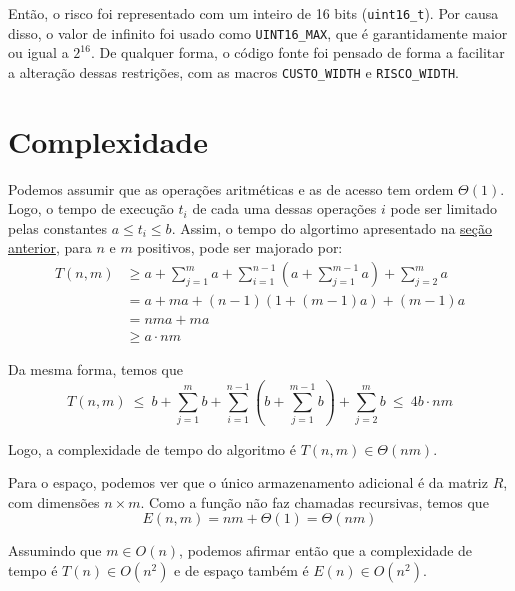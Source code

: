Então, o risco foi representado com um inteiro de 16 bits (\texttt{uint16\_t}). Por causa disso, o valor de infinito foi usado como \texttt{UINT16_MAX}, que é garantidamente maior ou igual a $2^{16}$. De qualquer forma, o código fonte foi pensado de forma a facilitar a alteração dessas restrições, com as macros \texttt{CUSTO\_WIDTH} e \texttt{RISCO\_WIDTH}.

\section{Complexidade}

Podemos assumir que as operações aritméticas e as de acesso tem ordem $\Theta(1)$. Logo, o tempo de execução $t_i$ de cada uma dessas operações $i$ pode ser limitado pelas constantes $a \leq t_i \leq b$. Assim, o tempo do algortimo apresentado na \hyperref[sec:alg]{seção anterior}, para $n$ e $m$ positivos, pode ser majorado por:
\begin{align*}
    T(n, m) &\geq a + \sum_{j = 1}^m a + \sum_{i = 1}^{n - 1} \left( a + \sum_{j = 1}^{m - 1} a \right) + \sum_{j = 2}^m a \\
    &= a + m a + (n - 1) (1 + (m - 1) a) + (m - 1) a \\
    &= n m a + m a \\
    &\geq a \cdot n m
\end{align*}

Da mesma forma, temos que
\[
    T(n, m) ~\leq~ b + \sum_{j = 1}^m b + \sum_{i = 1}^{n - 1} \left( b + \sum_{j = 1}^{m - 1} b \right) + \sum_{j = 2}^m b ~\leq~ 4 b \cdot n m
\]

Logo, a complexidade de tempo do algoritmo é $T(n, m) \in \Theta(n m)$.

Para o espaço, podemos ver que o único armazenamento adicional é da matriz $R$, com dimensões $n \times m$. Como a função não faz chamadas recursivas, temos que
\[
    E(n, m) = n m + \Theta(1) = \Theta(n m)
\]

Assumindo que $m \in O(n)$, podemos afirmar então que a complexidade de tempo é $T(n) \in O\left(n^2\right)$ e de espaço também é $E(n) \in O\left(n^2\right)$.
